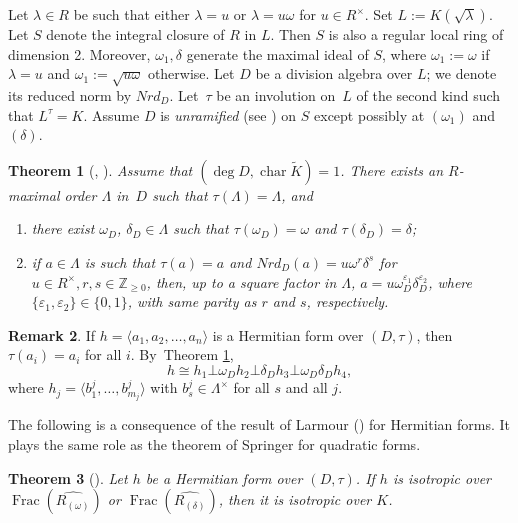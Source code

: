 \documentclass[10pt]{amsart}
\DeclareMathOperator{\Char}{char}
\DeclareMathOperator{\Frac}{Frac}
\let\epsilon\varepsilon
\let\<\langle
\let\>\rangle
\newtheorem{thm}{Theorem}[section]
\theoremstyle{definition}
\newtheorem{rem}[thm]{Remark}
\begin{document}
Let $\lambda \in R$ be such that either $\lambda=u$ or $\lambda=u\omega$ for $u \in R^{\times}$. Set $L:=K(\sqrt{\lambda})$. Let $S$ denote the integral closure of $R$ in $L$. Then $S$ is also a regular local ring of dimension 2. Moreover, $\omega_1, \delta$ generate the maximal ideal of $S$, where $\omega_1:=\omega$ if $\lambda=u$ and $\omega_1:=\sqrt{u\omega}$ otherwise.
Let $D$ be a division algebra over $L$; we denote its reduced norm by $Nrd_D$. Let~$\tau$ be an involution on~$L$ of the second kind such that $L^{\tau}=K$.
Assume $D$ is \emph{unramified} (see \cite[p.\,4]{parsur}) on $S$ except possibly at $(\omega_1)$ and $(\delta)$.

\begin{thm}[{\cite[Lem.\,3.7]{wu}, \cite[Lem.\,9.3]{parsur}}] \label{7.4.1} Assume that $(\deg{D}, \Char \widetilde{K})=1$. There exists an $R$-maximal order $\Lambda$ in~$D$ such that
$\tau(\Lambda)=\Lambda$, and
\begin{enumerate}
\item there exist $\omega_D$, $\delta_D \in \Lambda$ such that $\tau(\omega_D)=\omega$ and $\tau(\delta_D)=\delta$;
\item if $a \in \Lambda$ is such that $\tau(a)=a$ and $Nrd_D(a)=u \omega^r \delta^s$ for $u \in R^{\times}, r,s \in \mathbb{Z}_{\geqslant 0}$, then, up to a square factor in $\Lambda$, $a=u \omega_D^{\epsilon_1} \delta_D^{\epsilon_2}$, where $\{\epsilon_1, \epsilon_2\} \in \{0,1\}$, with same parity as $r$ and $s$, respectively.
\end{enumerate}
\end{thm}

\begin{rem}{\label{7.4.2}} If $h=\<a_1, a_2, \dots, a_n\>$ is a Hermitian form over $(D, \tau)$, then \hbox{$\tau(a_i)=a_i$} for all $i$. By~Theorem \ref{7.4.1},
\[
h \cong h_1 \bot \omega_D h_2 \bot \delta_D h_3 \bot \omega_D \delta_D h_4,
\]
where $h_j=\< b_{1}^j,\dots, b_{m_j}^j\>$ with $b_{s}^j \in \Lambda^{\times}$ for all $s$ and all $j$.
\end{rem}
The following is a consequence of the result of Larmour (\cite{larmour}) for Hermitian forms. It plays the same role as the theorem of Springer for quadratic forms.
\begin{thm}[{\cite[Cor.\,9.5]{parsur}}] \label{7.4.3}
Let $h$ be a Hermitian form over $(D, \tau)$. If $h$ is isotropic over $\Frac(\widehat{R_{(\omega)}})$ or $\Frac(\widehat{R_{(\delta)}})$, then it is isotropic over $K$.
\end{thm}
\end{document}
